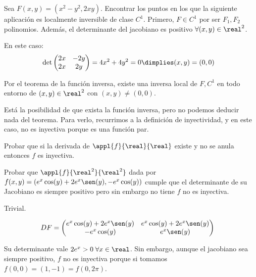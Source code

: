 \begin{problem}[0]
\label{ej3_0}
Sea $F(x,y) = (x^2-y^2,2xy)$. Encontrar los puntos en los que la siguiente aplicación es localmente inversible de clase $C^1$.
\solution
Primero,  $F \in C^1$ por ser $F_1,F_2$ polinomios. Además, el determinante del jacobiano es positivo $\forall (x,y)\in \real^2$. 
 
 En este caso: $$\det\begin{pmatrix}
                  2x&-2y\\
                  2x&2y
                 \end{pmatrix} = 4x^2 + 4y^2 = 0 \dimplies (x,y) = (0,0)$$           
                 
  Por el teorema de la función inversa, existe una inversa local de $F,C^1$ en todo entorno de $(x,y) \in \real^2$ con $(x,y)\neq (0,0)$. 
 
 Está la posibilidad de que exista la función inversa, pero no podemos deducir nada del teorema. Para verlo, recurrimos a la definición de inyectividad, y en este caso, no es inyectiva porque es una función par.

 \end{problem}

\begin{problem}[3]

\ppart Probar que si la derivada de $\appl{f}{\real}{\real}$ existe y no se anula entonces $f$ es inyectiva.

\ppart Probar que $\appl{f}{\real^2}{\real^2}$ dada por $f(x,y) =( e^x\cos(y) + 2e^x\sen(y),-e^x\cos(y))$ cumple que el determinante de su Jacobiano es siempre positivo pero sin embargo no tiene $f$ no es inyectiva.

\solution

\ppart Trivial.

\ppart  \[ DF = \begin{pmatrix}
       e^x\cos(y)+2e^x\sen(y) & e^x\cos(y)+2e^x\sen(y) \\
       -e^x\cos(y) & e^x\sen(y)
      \end{pmatrix} \]

Su determinante vale $2e^x > 0\; \forall x \in \real$. Sin embargo, aunque el jacobiano sea siempre positivo, $f$ no es inyectiva porque si tomamos $f(0,0) = (1,-1) = f(0,2\pi)$.
\end{problem}


